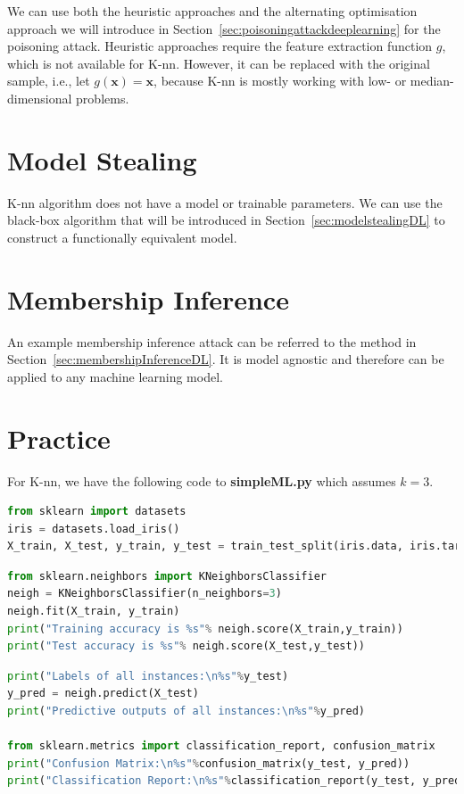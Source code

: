 We can use both the heuristic approaches and the alternating optimisation approach we will introduce in Section~\ref{sec:poisoningattackdeeplearning} for the poisoning attack. Heuristic approaches require the feature extraction function $g$, which is not available for K-nn. However, it can be replaced with the original sample, i.e., let $g(\textbf{x})=\textbf{x}$, because K-nn is mostly working with low- or median-dimensional problems. 

\section{Model Stealing} 

K-nn algorithm does not have a model or trainable parameters. We can use the black-box algorithm that will be introduced in Section~\ref{sec:modelstealingDL} to construct a functionally equivalent model. 


\section{Membership Inference}

An example membership inference attack can be referred to the method in Section~\ref{sec:membershipInferenceDL}. It is  model agnostic and therefore can be applied to any machine learning model.  

\newpage
\section{Practice}


For K-nn, we have the following code to \textbf{simpleML.py} which assumes $k=3$. 

\begin{lstlisting}[language=Python]
from sklearn import datasets
iris = datasets.load_iris()
X_train, X_test, y_train, y_test = train_test_split(iris.data, iris.target, test_size=0.20)
\end{lstlisting}

\begin{lstlisting}[language=Python]
from sklearn.neighbors import KNeighborsClassifier
neigh = KNeighborsClassifier(n_neighbors=3)
neigh.fit(X_train, y_train)
print("Training accuracy is %s"% neigh.score(X_train,y_train))
print("Test accuracy is %s"% neigh.score(X_test,y_test))
\end{lstlisting}


\begin{lstlisting}[language=Python]
print("Labels of all instances:\n%s"%y_test)
y_pred = neigh.predict(X_test)
print("Predictive outputs of all instances:\n%s"%y_pred)

from sklearn.metrics import classification_report, confusion_matrix
print("Confusion Matrix:\n%s"%confusion_matrix(y_test, y_pred))
print("Classification Report:\n%s"%classification_report(y_test, y_pred))
\end{lstlisting}

